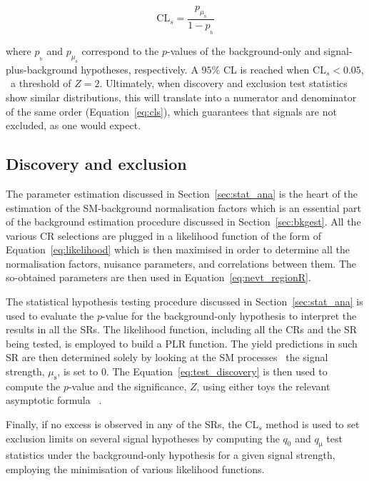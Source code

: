 			\begin{equation}
				\mathrm{CL}_s = \frac{p_{\mu_{\mathrm{s}}}} {1 - p_{_\mathrm{b}}}
			\label{eq:cls}
			\end{equation}

			\noindent where $p_{_\mathrm{b}}$ and $p_{\mu_{\mathrm{s}}}$ correspond to the $p$-values of the background-only and signal-plus-background hypotheses, respectively. A $95\%$ \ac{CL} is reached when $\mathrm{CL}_s < 0.05$, \ie\ a threshold of $Z = 2$. Ultimately, when discovery and exclusion test statistics show similar distributions, this will translate into a numerator and denominator of the same order (Equation~\ref{eq:cls}), which guarantees that signals are not excluded, as one would expect.


			\subsection{Discovery and exclusion}

				The parameter estimation discussed in Section~\ref{sec:stat_ana} is the heart of the estimation of the \ac{SM}-background normalisation factors which is an essential part of the background estimation procedure discussed in Section~\ref{sec:bkgest}. All the various \ac{CR} selections are plugged in a likelihood function of the form of Equation~\ref{eq:likelihood} which is then maximised in order to determine all the normalisation factors, nuisance parameters, and correlations between them. The so-obtained parameters are then used in Equation~\ref{eq:nevt_regionR}. 

				The statistical hypothesis testing procedure discussed in Section~\ref{sec:stat_ana} is used to evaluate the $p$-value for the background-only hypothesis to interpret the results in all the \acp{SR}. The likelihood function, including all the \acp{CR} and the \ac{SR} being tested, is employed to build a \ac{PLR} function. The yield predictions in such \ac{SR} are then determined solely by looking at the \ac{SM} processes \ie\ the signal strength, $\mu_{\mathrm{s}}$, is set to $0$. The Equation~\ref{eq:test_discovery} is then used to compute the $p$-value and the significance, $Z$, using either toys the relevant asymptotic formula ~\cite{Cowan2011}.

				Finally, if no excess is observed in any of the \acp{SR}, the $\mathrm{CL}_s$ method is used to set exclusion limits on several signal hypotheses by computing the $q_0$ and $q_{\mathrm{\mu}}$ test statistics under the background-only hypothesis for a given signal strength, employing the minimisation of various likelihood functions. %



